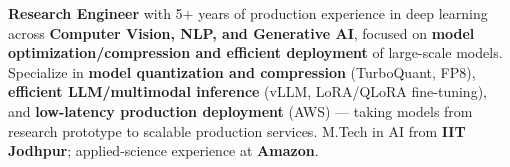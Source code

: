 \documentclass[letter,10pt]{article}
\begin{document}

\textbf{Research Engineer} with 5+ years of production experience in deep learning across \textbf{Computer Vision, NLP, and Generative AI}, focused on \textbf{model optimization/compression and efficient deployment} of large-scale models.
Specialize in \textbf{model quantization and compression} (TurboQuant, FP8), \textbf{efficient LLM/multimodal inference} (vLLM, LoRA/QLoRA fine-tuning), and \textbf{low-latency production deployment} (AWS) — taking models from research prototype to scalable production services.
M.Tech in AI from \textbf{IIT Jodhpur}; applied-science experience at \textbf{Amazon}.
\end{document}
